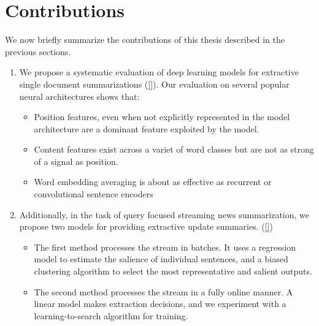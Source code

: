   \section{Contributions}
  
  We now briefly summarize the contributions of this thesis described
  in the previous sections.
  
  
  \begin{enumerate}
          \item We propose a systematic evaluation of deep learning models
              for extractive single document summarizations (\autoref{}). 
              Our evaluation on several popular neural architectures shows 
              that:
              \begin{itemize}
                  \item Position features, even when not explicitly represented
                      in the model architecture are a dominant feature
                      exploited by the model.
                  \item Content features exist across a variet of word classes
                      but are not as strong of a signal as position.
                  \item Word embedding averaging is about as effective as 
                      recurrent or convolutional sentence encoders 
              \end{itemize}
          \item Additionally, in the task of query focused streaming news 
              summarization, we propose two models for providing 
              extractive update summaries. (\autoref{})
              \begin{itemize}
  
                  \item The first method processes the stream in  batches. 
                      It uses a regression model
                      to estimate the salience of individual 
                      sentences, and a biased clustering algorithm to select
                      the most representative and salient outputs.
                  \item The second method processes the stream in a fully
                      online manner. A linear model makes extraction
                      decisions, and we experiment with a learning-to-search
                      algorithm for training. 
              \end{itemize}
      \end{enumerate}
  
